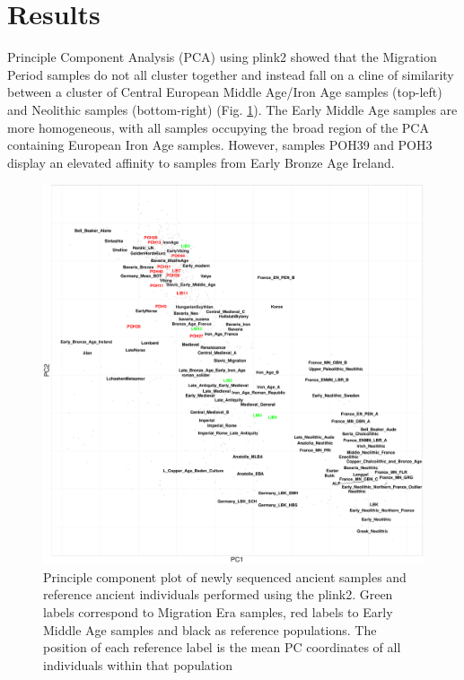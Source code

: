 \section{Results}

Principle Component Analysis (PCA) using plink2 showed that the Migration Period samples do not all cluster together and instead fall on a cline of similarity between a cluster of Central European Middle Age/Iron Age samples (top-left) and Neolithic samples (bottom-right) (Fig. \ref{fig:AllChr.plink_PCA}). The Early Middle Age samples are more homogeneous, with all samples occupying the broad region of the PCA containing European Iron Age samples. However, samples POH39 and POH3 display an elevated affinity to samples from Early Bronze Age Ireland. 

\begin{figure}[htp]
    \centering
    \includegraphics[width=1.0\textwidth]{../images/chapter5/plink_pca.pdf}
    \caption{Principle component plot of newly sequenced ancient samples and reference ancient individuals performed using the plink2. Green labels correspond to Migration Era samples, red labels to Early Middle Age samples and black as reference populations. The position of each reference label is the mean PC coordinates of all individuals within that population}
    \label{fig:AllChr.plink_PCA}
\end{figure}


